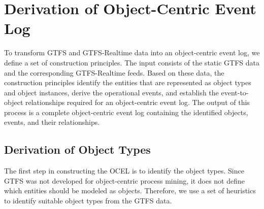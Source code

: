 


\section{Derivation of Object-Centric Event Log}

To transform GTFS and GTFS-Realtime data into an object-centric event log, we define a set of construction principles. The input consists of the static GTFS data and the corresponding GTFS-Realtime feeds. Based on these data, the construction principles identify the entities that are represented as object types and object instances, derive the operational events, and establish the event-to-object relationships required for an object-centric event log. The output of this process is a complete object-centric event log containing the identified objects, events, and their relationships.



\subsection{Derivation of Object Types}
The first step in constructing the OCEL is to identify the object types. Since GTFS was not developed for object-centric process mining, it does not define which entities should be modeled as objects. Therefore, we use a set of heuristics to identify suitable object types from the GTFS data.

